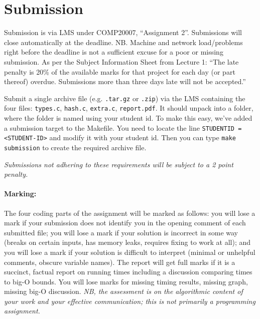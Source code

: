 \documentclass[11pt]{article}
\begin{document}
\section*{Submission}

Submission is via LMS under COMP20007, ``Assignment 2''.
Submissions will close automatically at the deadline.
NB\@. Machine and network load/problems right before the deadline is
not a sufficient excuse for a poor or missing submission.
As per the Subject Information Sheet from Lecture 1: ``The late penalty is 20\%
of the available marks for that project
for each day (or part thereof) overdue.
Submissions more than three days late will not be accepted.''

Submit a single archive file (e.g. \texttt{.tar.gz} or \texttt{.zip}) via the
LMS containing the four files:
\texttt{types.c},
\texttt{hash.c},
\texttt{extra.c},
\texttt{report.pdf}.
It should unpack into a folder, where the folder is named using your student id.
To make this easy, we've added a submission target to the Makefile.
You need to locate the line \texttt{STUDENTID = <STUDENT-ID>} and modify it with your student id.
Then you can type \texttt{make submission} to create the required archive file.

\emph{Submissions not adhering to these requirements will be subject to a 2 point penalty.}

\paragraph{Marking:}
The four coding parts of the assignment will be marked as follows:
you will lose a mark if your submission does not identify you in the opening comment of each submitted file;
you will lose a mark if your solution is incorrect in some way
(breaks on certain inputs, has memory leaks, requires fixing to work at all);
and you will lose a mark if your solution is difficult to interpret
(minimal or unhelpful comments, obscure variable names).
The report will get full marks if it is a succinct,
factual report on running times including a discussion comparing times to big-O bounds.
You will lose marks for missing timing results,
missing graph, missing big-O discussion.
\emph{NB, the assessment is on the algorithmic content of your work and your effective
communication; this is not primarily a programming assignment.}
\end{document}
